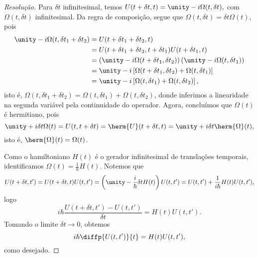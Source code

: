 \begin{proof}[Resolução]
    Para \(\delta t\) infinitesimal, temos \(U(t + \delta t, t) = \unity - i \Omega(t, \delta t),\) com \(\Omega(t, \delta t)\) infinitesimal. Da  regra de composição, segue que \(\Omega(t, \delta t) = \delta t \Omega(t)\), pois
    \begin{align*}
        \unity - i \Omega(t, \delta t_1 + \delta t_2) &= U(t + \delta t_1 + \delta t_2, t)\\
                                                      &= U(t + \delta t_1 + \delta t_2, t + \delta t_1) U(t + \delta t_1, t)\\
                                                      &= \left(\unity - i \Omega(t + \delta t_1, \delta t_2)\right)\left(\unity - i \Omega(t, \delta t_1)\right)\\
                                                      &= \unity - i \left[\Omega(t + \delta t_1, \delta t_2) + \Omega(t, \delta t_1)\right]\\
                                                      &= \unity - i\left[\Omega(t, \delta t_1) + \Omega(t, \delta t_2)\right],
    \end{align*}
    isto é, \(\Omega(t, \delta t_1 + \delta t_2) = \Omega(t, \delta t_1) + \Omega(t, \delta t_2)\), donde inferimos a linearidade na segunda variável pela continuidade do operador. Agora, concluímos que \(\Omega(t)\) é hermitiano, pois
    \begin{equation*}
        \unity + i \delta t \Omega(t) = U(t, t + \delta t) = \herm{U}(t + \delta t, t) = \unity + i \delta t \herm{\Omega}(t),
    \end{equation*}
    isto é, \(\herm{\Omega}(t) = \Omega(t)\). 

    Como o hamiltoniano \(H(t)\) é o gerador infinitesimal de translações temporais, identificamos \(\Omega(t) = \frac{1}{\hbar} H(t)\). Notemos que
    \begin{equation*}
        U(t + \delta t, t') = U(t + \delta t, t) U(t, t') = \left(\unity - \frac{i}{\hbar} \delta t H(t)\right) U(t, t') = U(t, t') + \frac{1}{i\hbar} H(t) U(t, t'),
    \end{equation*}
    logo 
    \begin{equation*}
        i \hbar \frac{U(t + \delta t, t') - U(t, t')}{\delta t} = H(t) U(t, t').
    \end{equation*}
    Tomando o limite \(\delta t \to 0\), obtemos
    \begin{equation*}
        i \hbar \diffp{U(t, t')}{t} = H(t) U(t, t'),
    \end{equation*}
    como desejado.
\end{proof}
